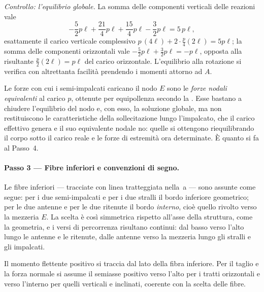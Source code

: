 \medskip
\noindent\emph{Controllo: l'equilibrio globale.}
La somma delle componenti verticali delle reazioni vale
\[
	-\frac{5}{2}p\ell + \frac{21}{4}p\ell
	+ \frac{15}{4}p\ell - \frac{3}{2}p\ell = 5\,p\ell ,
\]
esattamente il carico verticale complessivo
$p\,(4\ell) + 2\cdot\tfrac{p}{4}(2\ell) = 5p\ell$; la somma
delle componenti orizzontali vale
$-\tfrac52 p\ell + \tfrac32 p\ell = -p\ell$, opposta alla
risultante $\tfrac{p}{2}(2\ell) = p\ell$ del carico
orizzontale. L'equilibrio alla rotazione si verifica con
altrettanta facilità prendendo i momenti attorno ad $A$.

\begin{oss}
	Le forze con cui i semi-impalcati caricano il nodo $E$
	sono le \emph{forze nodali equivalenti} al carico $p$,
	ottenute per equipollenza secondo la
	. Esse bastano a
	chiudere l'equilibrio del nodo e, con esso, la soluzione
	globale, ma non restituiscono le caratteristiche della
	sollecitazione lungo l'impalcato, che il carico effettivo
	genera e il suo equivalente nodale no: quelle si
	ottengono riequilibrando il corpo sotto il carico reale
	e le forze di estremità ora determinate. È quanto si fa
	al Passo~4.
\end{oss}

\paragraph{Passo 3 --- Fibre inferiori e convenzioni di segno.}

Le fibre inferiori --- tracciate con linea tratteggiata
nella \,a --- sono assunte come
segue: per i due semi-impalcati e per i due stralli il bordo
inferiore geometrico; per le due antenne e per le due
ritenute il bordo \emph{interno}, cioè quello rivolto verso
la mezzeria $E$. La scelta è così simmetrica rispetto
all'asse della struttura, come la geometria, e i versi di
percorrenza risultano continui: dal basso verso l'alto lungo
le antenne e le ritenute, dalle antenne verso la mezzeria
lungo gli stralli e gli impalcati.

Il momento flettente positivo si traccia dal lato della
fibra inferiore. Per il taglio e la forza normale si assume
il semiasse positivo verso l'alto per i tratti orizzontali e
verso l'interno per quelli verticali e inclinati, coerente
con la scelta delle fibre.

